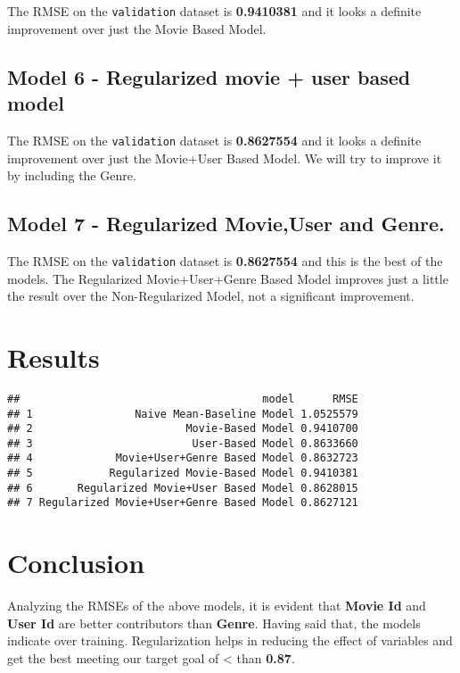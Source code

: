 \documentclass[
]{article}
\begin{document}
The RMSE on the \texttt{validation} dataset is \textbf{0.9410381} and it
looks a definite improvement over just the Movie Based Model.

\hypertarget{model-6---regularized-movie-user-based-model}{%
\subsection{Model 6 - Regularized movie + user based
model}\label{model-6---regularized-movie-user-based-model}}

The RMSE on the \texttt{validation} dataset is \textbf{0.8627554} and it
looks a definite improvement over just the Movie+User Based Model. We
will try to improve it by including the Genre.

\hypertarget{model-7---regularized-movieuser-and-genre.}{%
\subsection{Model 7 - Regularized Movie,User and
Genre.}\label{model-7---regularized-movieuser-and-genre.}}

The RMSE on the \texttt{validation} dataset is \textbf{0.8627554} and
this is the best of the models. The Regularized Movie+User+Genre Based
Model improves just a little the result over the Non-Regularized Model,
not a significant improvement.

\hypertarget{results}{%
\section{Results}\label{results}}

\begin{verbatim}
##                                      model      RMSE
## 1                Naive Mean-Baseline Model 1.0525579
## 2                        Movie-Based Model 0.9410700
## 3                         User-Based Model 0.8633660
## 4             Movie+User+Genre Based Model 0.8632723
## 5            Regularized Movie-Based Model 0.9410381
## 6       Regularized Movie+User Based Model 0.8628015
## 7 Regularized Movie+User+Genre Based Model 0.8627121
\end{verbatim}

\hypertarget{conclusion}{%
\section{Conclusion}\label{conclusion}}

Analyzing the RMSEs of the above models, it is evident that
\textbf{Movie Id} and \textbf{User Id} are better contributors than
\textbf{Genre}. Having said that, the models indicate over training.
Regularization helps in reducing the effect of variables and get the
best meeting our target goal of \textless{} than \textbf{0.87}.
\end{document}
